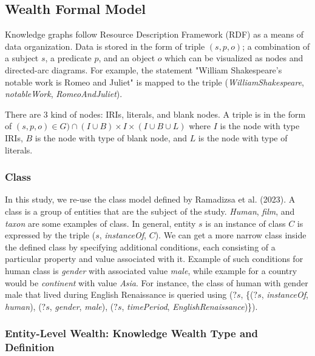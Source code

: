 \subsection{Wealth Formal Model}
Knowledge graphs follow Resource Description Framework (RDF) as a means of data organization. Data is stored in the form of triple \((s, p, o)\); a combination of a subject \(s\), a predicate \(p\), and an object \(o\) which can be visualized as nodes and directed-arc diagrams. For example, the statement "William Shakespeare's notable work is Romeo and Juliet" is mapped to the triple (\textit{WilliamShakespeare}, \textit{notableWork}, \textit{RomeoAndJuliet}).

There are 3 kind of nodes: IRIs, literals, and blank nodes. A triple is in the form of \((s, p, o) \in G) \cap (I \cup B) \times I \times (I \cup B \cup L) \) where \(I\) is the node with type IRIs, \(B\) is the node with type of blank node, and \(L\) is the node with type of literals.

\subsubsection{Class}
In this study, we re-use the class model defined by Ramadizsa et al. (2023). A class is a group of entities that are the subject of the study. \textit{Human}, \textit{film}, and \textit{taxon} are some examples of class. In general, entity \(s\) is an instance of class \(C\) is expressed by the triple (\(s\), \textit{instanceOf}, \(C\)). We can get a more narrow class inside the defined class by specifying additional conditions, each consisting of a particular property and value associated with it. Example of such conditions for human class is \textit{gender} with associated value \textit{male}, while example for a country would be \textit{continent} with value \textit{Asia}. For instance, the class of human with gender male that lived during English Renaissance is queried using (\(?s\), \{(\(?s\), \textit{instanceOf}, \textit{human}), (\(?s\), \textit{gender}, \textit{male}), (\(?s\), \textit{timePeriod}, \textit{EnglishRenaissance})\}).

\subsubsection{Entity-Level Wealth: Knowledge Wealth Type and Definition}

